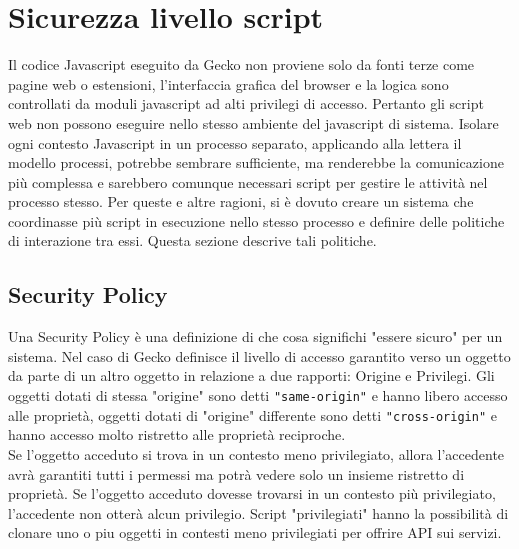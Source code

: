\documentclass{sapthesis}
\newcommand{\code}[1]{\texttt{#1}}
\newcommand{\JS}{Javascript}
\begin{document}
    \section{Sicurezza livello script}
    \label{sec:sicurezza-script}
        Il codice Javascript eseguito da Gecko non proviene solo da fonti terze come pagine web o estensioni,
        l'interfaccia grafica del browser e la logica sono controllati da moduli javascript ad
        alti privilegi di accesso. Pertanto gli script web non possono eseguire nello stesso ambiente del
        javascript di sistema. Isolare ogni contesto \JS{} in un processo separato, applicando alla lettera
        il modello processi, potrebbe sembrare sufficiente, ma renderebbe la comunicazione più complessa
        e sarebbero comunque necessari script per gestire le attività nel processo stesso.
        Per queste e altre ragioni, si è dovuto creare un sistema che coordinasse più script in esecuzione
        nello stesso processo e definire delle politiche di interazione tra essi. 
        Questa sezione descrive tali politiche.

        \subsection{Security Policy}
        \label{sec:sicurezza-script-security-policy}
            Una Security Policy è una definizione di che cosa significhi "essere sicuro" per un sistema.
            Nel caso di Gecko definisce il livello di accesso garantito verso un oggetto da parte di un
            altro oggetto in relazione a due rapporti: Origine e Privilegi.
            Gli oggetti dotati di stessa "origine" sono detti \code{"same-origin"} e hanno libero accesso
            alle proprietà, oggetti dotati di "origine" differente sono detti \code{"cross-origin"}
            e hanno accesso molto ristretto alle proprietà reciproche.\\
            Se l'oggetto acceduto si trova in un contesto meno privilegiato, allora l'accedente avrà
            garantiti tutti i permessi ma potrà vedere solo un insieme ristretto di proprietà.
            Se l'oggetto acceduto dovesse trovarsi in un contesto più privilegiato, l'accedente non otterà 
            alcun privilegio.
            Script "privilegiati" hanno la possibilità di clonare uno o piu oggetti in contesti
            meno privilegiati per offrire API sui servizi.
\end{document}
